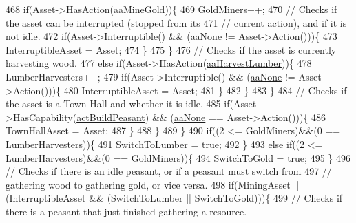 \begin{DoxyCode}
468                 \textcolor{keywordflow}{if}(Asset->HasAction(\hyperlink{GameDataTypes_8h_ab47668e651a3032cfb9c40ea2d60d670abc45b1c4fbca1481e373a780a69bd56b}{aaMineGold}))\{
469                     GoldMiners++; 
470                     \textcolor{comment}{// Checks if the asset can be interrupted (stopped from its}
471                     \textcolor{comment}{// current action), and if it is not idle.}
472                     \textcolor{keywordflow}{if}(Asset->Interruptible() && (\hyperlink{GameDataTypes_8h_ab47668e651a3032cfb9c40ea2d60d670ac17cc5a0035320c060d7f8074143b507}{aaNone} != Asset->Action()))\{
473                         InterruptibleAsset = Asset;
474                     \}
475                 \}
476                 \textcolor{comment}{// Checks if the asset is currently harvesting wood.}
477                 \textcolor{keywordflow}{else} \textcolor{keywordflow}{if}(Asset->HasAction(\hyperlink{GameDataTypes_8h_ab47668e651a3032cfb9c40ea2d60d670a4c44c3d83b3b67a8dd2248d11bedd0ee}{aaHarvestLumber}))\{
478                     LumberHarvesters++;
479                     \textcolor{keywordflow}{if}(Asset->Interruptible() && (\hyperlink{GameDataTypes_8h_ab47668e651a3032cfb9c40ea2d60d670ac17cc5a0035320c060d7f8074143b507}{aaNone} != Asset->Action()))\{
480                         InterruptibleAsset = Asset;
481                     \}
482                 \}
483             \}
484             \textcolor{comment}{// Checks if the asset is a Town Hall and whether it is idle.}
485             \textcolor{keywordflow}{if}(Asset->HasCapability(\hyperlink{GameDataTypes_8h_a35b98ce26aca678b03c6f9f76e4778cea66c601dce0fc095460b3c2c25f66ee71}{actBuildPeasant}) && (\hyperlink{GameDataTypes_8h_ab47668e651a3032cfb9c40ea2d60d670ac17cc5a0035320c060d7f8074143b507}{aaNone} == Asset->Action()))\{
486                 TownHallAsset = Asset;
487             \}
488         \}
489     \}
490     \textcolor{keywordflow}{if}((2 <= GoldMiners)&&(0 == LumberHarvesters))\{
491         SwitchToLumber = \textcolor{keyword}{true}; 
492     \}
493     \textcolor{keywordflow}{else} \textcolor{keywordflow}{if}((2 <= LumberHarvesters)&&(0 == GoldMiners))\{
494         SwitchToGold = \textcolor{keyword}{true}; 
495     \}
496     \textcolor{comment}{// Checks if there is an idle peasant, or if a peasant must switch from}
497     \textcolor{comment}{// gathering wood to gathering gold, or vice versa.}
498     \textcolor{keywordflow}{if}(MiningAsset || (InterruptibleAsset && (SwitchToLumber || SwitchToGold)))\{
499         \textcolor{comment}{// Checks if there is a peasant that just finished gathering a resource.}

\end{DoxyCode}
